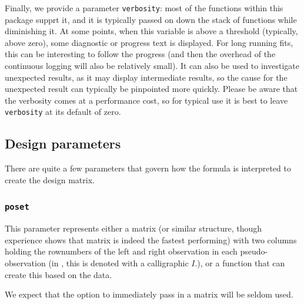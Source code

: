 \documentclass[12pt]{article}
\newcommand{\cd}[1]{\texttt{#1}}%
\begin{document}
Finally, we provide a parameter \cd{verbosity}: most of the functions within this package supprt it, and it is typically passed on down the stack of functions while diminishing it. At some points, when this variable is above a threshold (typically, above zero), some diagnostic or progress text is displayed. For long running fits, this can be interesting to follow the progress (and then the overhead of the continuous logging will also be relatively small). It can also be used to investigate unexpected results, as it may display intermediate results, so the cause for the unexpected result can typically be pinpointed more quickly. Please be aware that the verbosity comes at a performance cost, so for typical use it is best to leave \cd{verbosity} at its default of zero.

\subsection{Design parameters}\label{SS_design}
There are quite a few parameters that govern how the formula is interpreted to create the design matrix.
\subsubsection{\cd{poset}}
This parameter represents either a matrix (or similar structure, though experience shows that matrix is indeed the fastest performing) with two columns holding the rownumbers of the left and right observation in each pseudo-observation (in \cite{Thas2012}, this is denoted with a calligraphic $I$.), or a function that can create this based on the data.

We expect that the option to immediately pass in a matrix will be seldom used.
\end{document}
